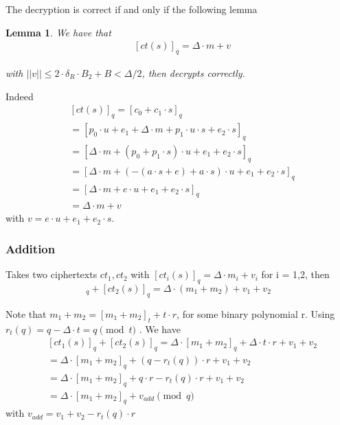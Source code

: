 \documentclass[A4paper,12pt]{article}
\newtheorem{lemma}[theorem]{Lemma}
\begin{document}
The decryption is correct if and only if the following lemma
\begin{lemma}
	We have that 
	\begin{equation}
		\begin{aligned}
		&[ct(s)]_q = \Delta \cdot m + v
		\end{aligned}
	\end{equation}
	 
	with $||v|| \leq 2 \cdot \delta_R \cdot B_2 + B < \Delta / 2$, then decrypts correctly. \cite{SHE}
\end{lemma}

Indeed
\begin{equation*}
\begin{aligned}
&[ct(s)]_q = [c_0 + c_1  \cdot s]_q \\
&= [p_0 \cdot u + e_1 + \Delta \cdot m + p_1 \cdot u \cdot s + e_2 \cdot s]_q \\
&= [\Delta \cdot m + (p_0 + p_1 \cdot s) \cdot u + e_1 + e_2 \cdot s]_q \\
&= [\Delta \cdot m + (-(a \cdot s + e) + a \cdot s) \cdot u + e_1 + e_2 \cdot s]_q \\
&= [\Delta \cdot m + e \cdot u + e_1 + e_2 \cdot s]_q \\
&= \Delta \cdot m + v
\end{aligned}
\end{equation*}
with $v = e \cdot u + e_1 + e_2 \cdot s $.
	\subsubsection{Addition}

Takes two ciphertexts $ct_1, ct_2$ with $[ct_i(s)]_q = \Delta \cdot m_i + v_i$ for i = 1,2, then 
\begin{equation*}
[ct_1(s)]_q + [ct_2(s)]_q = \Delta \cdot (m_1 + m_2) + v_1 + v_2 
\end{equation*}	

Note that $m_1 + m_2 = [m_1 + m_2]_t + t \cdot r$, for some binary polynomial r. Using $r_t(q) = q - \Delta \cdot t = q \pmod t$ . 
We have
\begin{equation*}
\begin{aligned}
	&[ct_1(s)]_q + [ct_2(s)]_q = \Delta \cdot [m_1 + m_2]_q + \Delta \cdot t \cdot r + v_1 + v_2\\
	&= \Delta \cdot [m_1 + m_2]_q + (q - r_t(q)) \cdot r + v_1 + v_2\\
	&= \Delta \cdot [m_1 + m_2]_q + q \cdot r - r_t(q) \cdot r + v_1 + v_2\\
	&= \Delta \cdot [m_1 + m_2]_q + v_{add} \pmod q
\end{aligned}
\end{equation*}
with $v_{add} = v_1 + v_2 - r_t(q) \cdot r$
\end{document}
